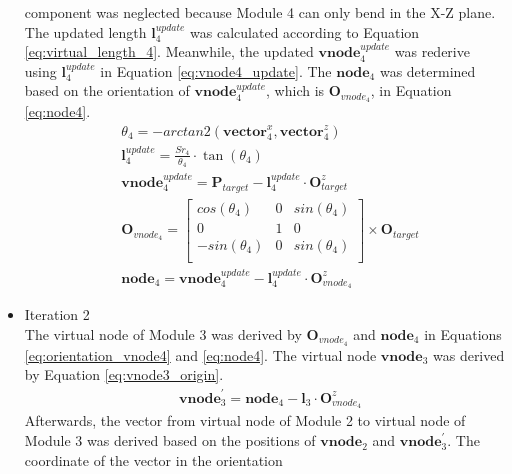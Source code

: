 \begin{itemize}
    component was neglected because Module 4 can only bend in the X-Z plane. The updated length $\textbf{l}_{4}^{update}$ 
    was calculated according to Equation \ref{eq:virtual_length_4}. Meanwhile, the updated 
    $\textbf{vnode}_{4}^{update}$ was rederive using $\textbf{l}_{4}^{update}$ in Equation \ref{eq:vnode4_update}. 
    The $\textbf{node}_4$ was determined based on the orientation of $\textbf{vnode}_{4}^{update}$, 
    which is $\textbf{O}_{vnode_4}$, in Equation \ref{eq:node4}.
    \begin{align}
        &\theta_4 = -arctan2(\textbf{vector}_{4}^{x},\textbf{vector}_{4}^{z})
        \label{eq:theta_4} \\
        &\textbf{l}_{4}^{update} = \frac{Sr_4}{\theta_4}\cdot \tan(\theta_4)
        \label{eq:virtual_length_4} \\
        &\textbf{vnode}_{4}^{update} = \textbf{P}_{target} - \textbf{l}_{4}^{update} \cdot \textbf{O}_{target}^{z}
        \label{eq:vnode4_update} \\
        &\textbf{O}_{vnode_4} =     
        \begin{bmatrix}
            cos(\theta_4) & 0 & sin(\theta_4) \\
            0 & 1 & 0 \\
            -sin(\theta_4) & 0 & sin(\theta_4) \\
        \end{bmatrix}  
        \times \textbf{O}_{target}
        \label{eq:orientation_vnode4} \\
        &\textbf{node}_4 = \textbf{vnode}_{4}^{update} - \textbf{l}_{4}^{update} \cdot \textbf{O}_{vnode_4}^{z}
        \label{eq:node4} 
    \end{align}
    \item Iteration 2 \\ %
    The virtual node of Module 3 was derived by $\textbf{O}_{vnode_4}$ and $\textbf{node}_{4}$ in Equations 
    \ref{eq:orientation_vnode4} and \ref{eq:node4}. The virtual node $\textbf{vnode}_{3}$ was derived by Equation 
    \ref{eq:vnode3_origin}.
    \begin{align}
        &\textbf{vnode}_{3}^{'} = \textbf{node}_{4} - \textbf{l}_{3} \cdot \textbf{O}_{vnode_4}^{z}
        \label{eq:vnode3_origin}
    \end{align}
    Afterwards, the vector from virtual node of Module 2 to virtual node of Module 3 was derived based on the 
    positions of $\textbf{vnode}_{2}$ and $\textbf{vnode}_{3}^{'}$. The coordinate of the vector in the orientation 

\end{itemize}
